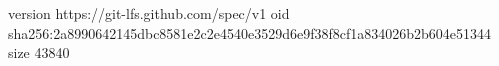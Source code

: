 version https://git-lfs.github.com/spec/v1
oid sha256:2a8990642145dbc8581e2c2e4540e3529d6e9f38f8cf1a834026b2b604e51344
size 43840
